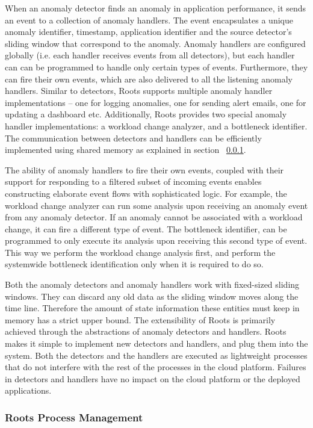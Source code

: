 When an anomaly detector finds an anomaly in application performance, it sends an event
to a collection of anomaly handlers. The event encapsulates a unique anomaly identifier, 
timestamp, application identifier and the source detector's sliding window that correspond to the
anomaly. Anomaly handlers are configured globally (i.e. each handler
receives events from all detectors), but each handler can can be programmed to handle only
certain types of events. Furthermore, they can fire their own events, which are also delivered to
all the listening anomaly handlers. Similar to detectors, Roots supports multiple anomaly handler
implementations -- one for logging anomalies, one for sending alert emails, one
for updating a dashboard etc. Additionally, Roots provides two special anomaly handler
implementations: a workload change analyzer, and a bottleneck identifier.
The communication between detectors and handlers can be efficiently implemented
using shared memory as explained in section ~\ref{sec:process_mgt}.

The ability of anomaly handlers to fire their own events, coupled with their support
for responding to a filtered subset of incoming events enables constructing
elaborate event flows with sophisticated logic. For example, the workload
change analyzer can run some analysis upon receiving an anomaly event
from any anomaly detector. If an anomaly cannot be associated with a workload
change, it can fire a different type of event. The bottleneck identifier, can
be programmed to only execute its analysis upon receiving this second type of event.
This way we perform the workload change analysis first, and perform the
systemwide bottleneck identification only when it is required to do so.

Both the anomaly detectors and anomaly handlers work with fixed-sized sliding windows.
They can discard any old data as the sliding window moves along the time line.
Therefore the amount of state information these entities must keep in memory has
a strict upper bound. 
The extensibility of Roots is primarily achieved through the abstractions of anomaly
detectors and handlers. Roots makes it simple to implement new detectors and handlers,
and plug them into the system. Both the detectors and the handlers are executed
as lightweight processes that do not interfere with the rest of the processes in
the cloud platform. Failures in detectors and handlers have no impact
on the cloud platform or the deployed applications.

\subsubsection{Roots Process Management}
\label{sec:process_mgt}

